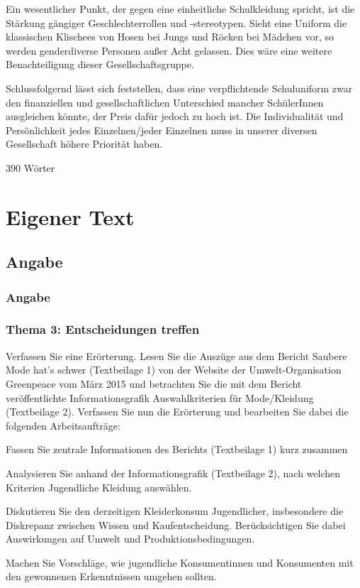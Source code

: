 Ein wesentlicher Punkt, der gegen eine einheitliche Schulkleidung spricht, ist die Stärkung gängiger Geschlechterrollen und -stereotypen. Sieht eine Uniform die klassischen Klischees von Hosen bei Jungs und Röcken bei Mädchen vor, so werden genderdiverse Personen außer Acht gelassen. Dies wäre eine weitere Benachteiligung dieser Gesellschaftsgruppe. 

Schlussfolgernd lässt sich feststellen, dass eine verpflichtende Schuluniform zwar den finanziellen und gesellschaftlichen Unterschied mancher SchülerInnen ausgleichen könnte, der Preis dafür jedoch zu hoch ist. Die Individualität und Persönlichkeit jedes Einzelnen/jeder Einzelnen muss in unserer diversen Gesellschaft höhere Priorität haben. 

390 Wörter 

\newpage
\section{Eigener Text}
\subsection{Angabe}
\subsubsection{Angabe}
\subsubsection{Thema 3: Entscheidungen treffen }
Verfassen Sie eine Erörterung.
Lesen Sie die Auszüge aus dem Bericht Saubere Mode hat’s schwer (Textbeilage 1) von der
Website der Umwelt-Organisation Greenpeace vom März 2015 und betrachten Sie die mit dem
Bericht veröffentlichte Informationsgrafik Auswahlkriterien für Mode/Kleidung (Textbeilage 2).
Verfassen Sie nun die Erörterung und bearbeiten Sie dabei die folgenden Arbeitsaufträge:

\begin{compactitem}
    \item Fassen Sie zentrale Informationen des Berichts (Textbeilage 1) kurz zusammen
    \item Analysieren Sie anhand der Informationsgrafik (Textbeilage 2), nach welchen Kriterien
    Jugendliche Kleidung auswählen. 
    \item Diskutieren Sie den derzeitigen Kleiderkonsum Jugendlicher, insbesondere die Diskrepanz
    zwischen Wissen und Kaufentscheidung. Berücksichtigen Sie dabei Auswirkungen auf Umwelt und Produktionsbedingungen.
    \item Machen Sie Vorschläge, wie jugendliche Konsumentinnen und Konsumenten mit den gewonnenen Erkenntnissen umgehen sollten.
\end{compactitem}


